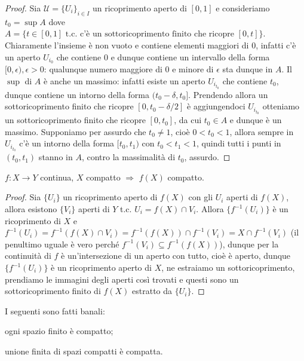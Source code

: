 \begin{proof}
  Sia $\mathcal{U}=\{U_i\}_{i \in I}$ un ricoprimento aperto di $[0, 1]$ e consideriamo $t_0=\sup{A}$ dove $A=\{t \in [0, 1] \text{ t.c. c'è un sottoricoprimento finito che ricopre } [0, t]\}$.
  Chiaramente l'insieme è non vuoto e contiene elementi maggiori di $0$, infatti c'è un aperto $U_{i_0}$ che contiene $0$ e dunque contiene un intervallo della forma $[0, \epsilon), \epsilon>0$: qualunque numero maggiore di $0$ e minore di $\epsilon$ sta dunque in $A$. Il $\sup$ di $A$ è anche un massimo: infatti esiste un aperto $U_{i_{t_0}}$ che contiene $t_0$, dunque contiene un intorno della forma $(t_0-\delta, t_0]$.
  Prendendo allora un sottoricoprimento finito che ricopre $[0, t_0-\delta/2]$ è aggiungendoci $U_{i_{t_0}}$ otteniamo un sottoricoprimento finito che ricopre $[0, t_0]$, da cui $t_0 \in A$ e dunque è un massimo.
  Supponiamo per assurdo che $t_0 \not=1$, cioè $0<t_0<1$, allora sempre in $U_{i_{t_0}}$ c'è un intorno della forma $[t_0, t_1)$ con $t_0<t_1<1$, quindi tutti i punti in $(t_0, t_1)$ stanno in $A$, contro la massimalità di $t_0$, assurdo.
\end{proof}

\begin{thm}
  $f:X \rightarrow Y$ continua, $X$ compatto $\Rightarrow$ $f(X)$ compatto.
\end{thm}

\begin{proof}
  Sia $\{U_i\}$ un ricoprimento aperto di $f(X)$ con gli $U_i$ aperti di $f(X)$, allora esistono $\{V_i\}$ aperti di $Y$ t.c. $U_i=f(X) \cap V_i$.
  Allora $\{f^{-1}(U_i)\}$ è un ricoprimento di $X$ e $f^{-1}(U_i)=f^{-1}(f(X) \cap V_i)=f^{-1}(f(X)) \cap f^{-1}(V_i)=X \cap f^{-1}(V_i)$ (il penultimo uguale è vero perché $f^{-1}(V_i) \subseteq f^{-1}(f(X))$), dunque per la continuità di $f$ è un'intersezione di un aperto con tutto, cioè è aperto, dunque $\{f^{-1}(U_i)\}$ è un ricoprimento aperto di $X$, ne estraiamo un sottoricoprimento, prendiamo le immagini degli aperti così trovati e questi sono un sottoricoprimento finito di $f(X)$ estratto da $\{U_i\}$.
\end{proof}

\begin{ftt}
  I seguenti sono fatti banali:
  \begin{nlist}
    \item ogni spazio finito è compatto;
    \item unione finita di spazi compatti è compatta.
  \end{nlist}
\end{ftt}

